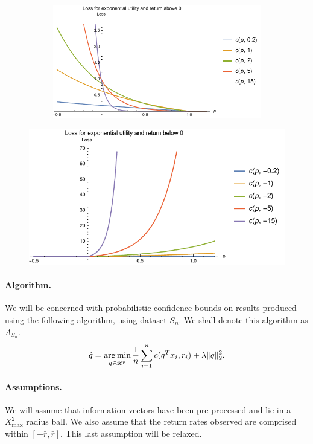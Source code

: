 \begin{figure}
  \centering
  \begin{subfigure}{.4\textwidth}
  \includegraphics[width=1.1\textwidth]{ExpULossAboveZero.pdf}
\end{subfigure}%
\begin{minipage}{.4\textwidth}
  \includegraphics[width=1.1\textwidth]{ExpULossBelowZero.pdf}
\end{minipage}
\end{figure}

\paragraph{Algorithm.}
We will be concerned with probabilistic confidence bounds on results produced using the
following algorithm, using dataset $S_n$. We shall denote this algorithm as $A_{S_n}$.
\begin{equation}
  \label{algo}
  \hat q = \operatorname*{arg\,min}_{q\in\mathscr{R}^p}\frac{1}{n} \sum_{i=1}^{n} c(q^Tx_i,r_i) + \lambda\|q\|^2_2.
\end{equation}

\paragraph{Assumptions.}
We will assume that information vectors have been pre-processed and lie in a $X^2_{\max}$
radius ball. We also assume that the return rates observed are comprised within $[-\bar r,
\bar r]$. This last assumption will be relaxed. 



